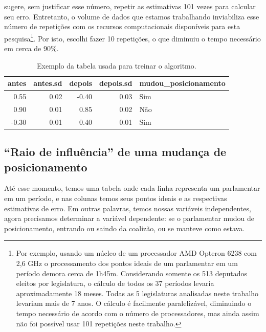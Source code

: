 \documentclass[a4paper,titlepage]{ppgi}\usepackage[]{graphicx}\usepackage[]{color}
\newenvironment{knitrout}{}{} %
\begin{document}
 sugere, sem justificar esse número, repetir as
estimativas 101 vezes para calcular seu erro. Entretanto, o volume de dados que
estamos trabalhando inviabiliza esse número de repetições com os recursos
computacionais disponíveis para esta pesquisa\footnote{Por exemplo, usando um
núcleo de um processador AMD Opteron\texttrademark{} 6238 com 2,6 GHz o
processamento dos pontos ideais de um parlamentar em um período demora cerca de
1h45m. Considerando somente os 513 deputados eleitos por legislatura, o
cálculo de todos os 37 períodos levaria aproximadamente 18 meses. Todas as 5
legislaturas analisadas neste trabalho levariam mais de 7 anos. O cálculo é
facilmente paralelizável, diminuindo o tempo necessário de acordo com o número
de processadores, mas ainda assim não foi possível usar 101 repetições neste
trabalho.}. Por isto, escolhi fazer 10 repetições, o que diminuiu o tempo
necessário em cerca de 90\%.

\begin{table}
\centering
\begin{knitrout}
\color{fgcolor}
\begin{tabular}{r|r|r|r|l}
\hline
antes & antes.sd & depois & depois.sd & mudou\_posicionamento\\
\hline
0.55 & 0.02 & -0.40 & 0.03 & Sim\\
\hline
0.90 & 0.01 & 0.85 & 0.02 & Não\\
\hline
-0.30 & 0.01 & 0.40 & 0.01 & Sim\\
\hline
\end{tabular}


\end{knitrout}
\caption{Exemplo da tabela usada para treinar o algoritmo.}
\label{table:dataset-final}
\end{table}

\subsection{``Raio de influência'' de uma mudança de posicionamento}
\label{cap:desenvolvimento:raio-de-influencia}

Até esse momento, temos uma tabela onde cada linha representa um parlamentar em
um período, e nas colunas temos seus pontos ideais e as respectivas estimativas
de erro. Em outras palavras, temos nossas variáveis independentes, agora
precisamos determinar a variável dependente: se o parlamentar mudou de
posicionamento, entrando ou saindo da coalizão, ou se manteve como estava.
\end{document}
